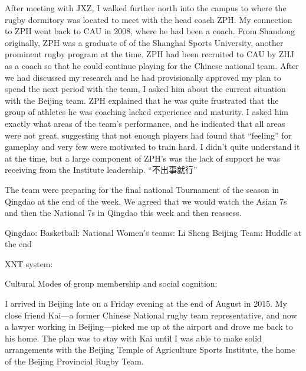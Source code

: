 After meeting with JXZ, I walked further north into the campus to where the rugby dormitory was located to meet with the head coach ZPH. My connection to ZPH went back to CAU in 2008, where he had been a coach. From Shandong originally, ZPH was a graduate of of the Shanghai Sports University, another prominent rugby program at the time.  ZPH had been recruited to CAU by ZHJ as a coach so that he could continue playing for the Chinese national team. After we had discussed my research and he had provisionally approved my plan to spend the next period with the team, I asked him about the current situation with the Beijing team.  ZPH explained that he was quite frustrated that the group of athletes he was coaching lacked experience and maturity. I asked him exactly what areas of the team's performance, and he indicated that all areas were not great, suggesting that not enough players had found that ``feeling'' for gameplay and very few were motivated to train hard.  I didn't quite understand it at the time, but a large component of ZPH's was the lack of support he was receiving from the Institute leadership.  ``不出事就行''

The team were preparing for the final national Tournament of the season in Qingdao at the end of the week.  We agreed that we would watch the Asian 7s and then the National 7s in Qingdao this week and then reassess.  

Qingdao:
Basketball:
National Women's teams: Li Sheng
Beijing Team: Huddle at the end




XNT system:



Cultural Modes of group membership and social cognition:



































I arrived in Beijing late on a Friday evening at the end of August in 2015.  My close friend Kai---a former Chinese National rugby team representative, and now a lawyer working in Beijing---picked me up at the airport and drove me back to his home.  The plan was to stay with Kai until I was able to make solid arrangements with the Beijing Temple of Agriculture Sports Institute, the home of the Beijing Provincial Rugby Team.

